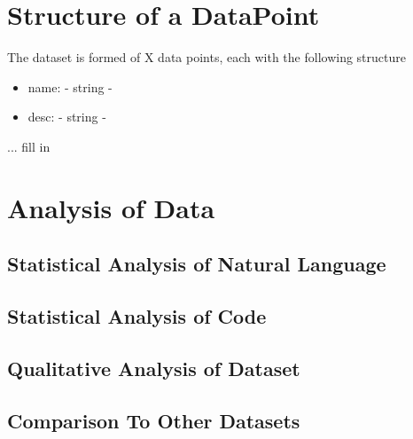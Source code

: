 
\section{Structure of a DataPoint} %
\label{sec:structure_of_datapoint}

The dataset is formed of X data points, each with the following structure
\begin{itemize}
    \item name: - string - 
    \item desc: - string - 

\end{itemize}
...
fill in 


\section{Analysis of Data} %
\label{sec:analysis_of_data}

\subsection{Statistical Analysis of Natural Language} %
\label{sub:statistical_analysis_of_natural_language}


\subsection{Statistical Analysis of Code} %
\label{sub:statistical_analysis_of_code}


\subsection{Qualitative Analysis of Dataset} %
\label{sub:qualitative_analysis_}


\subsection{Comparison To Other Datasets} %
\label{sub:comparison_to_other_datasets}

